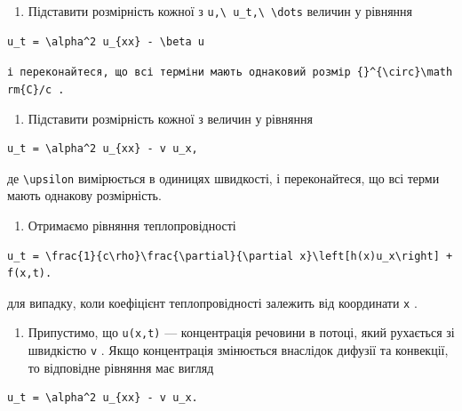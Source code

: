 \documentclass[
  ukrainian,
]{article}
\providecommand{\tightlist}{%
  \setlength{\itemsep}{0pt}\setlength{\parskip}{0pt}}
\begin{document}
\begin{enumerate}
\def\labelenumi{\arabic{enumi}.}
\tightlist
\item
  Підставити розмірність кожної з
  \texttt{u,\textbackslash{}\ u\_t,\textbackslash{}\ \textbackslash{}dots}
  величин у рівняння
\end{enumerate}

\begin{verbatim}
u_t = \alpha^2 u_{xx} - \beta u
\end{verbatim}

\texttt{і\ переконайтеся,\ що\ всі\ терміни\ мають\ однаковий\ розмір\ \textquotesingle{}\{\}\^{}\{\textbackslash{}circ\}\textbackslash{}mathrm\{C\}/c\textquotesingle{}\ .}

\begin{enumerate}
\def\labelenumi{\arabic{enumi}.}
\setcounter{enumi}{1}
\tightlist
\item
  Підставити розмірність кожної з величин у рівняння
\end{enumerate}

\begin{verbatim}
u_t = \alpha^2 u_{xx} - v u_x,
\end{verbatim}

де \texttt{\textbackslash{}upsilon} вимірюється в одиницях швидкості, і
переконайтеся, що всі терми мають однакову розмірність.

\begin{enumerate}
\def\labelenumi{\arabic{enumi}.}
\setcounter{enumi}{2}
\tightlist
\item
  Отримаємо рівняння теплопровідності
\end{enumerate}

\begin{verbatim}
u_t = \frac{1}{c\rho}\frac{\partial}{\partial x}\left[h(x)u_x\right] + f(x,t).
\end{verbatim}

для випадку, коли коефіцієнт теплопровідності залежить від координати
\texttt{x} .

\begin{enumerate}
\def\labelenumi{\arabic{enumi}.}
\setcounter{enumi}{3}
\tightlist
\item
  Припустимо, що \texttt{u(x,t)} --- концентрація речовини в потоці,
  який рухається зі швидкістю \texttt{v} . Якщо концентрація змінюється
  внаслідок дифузії та конвекції, то відповідне рівняння має вигляд
\end{enumerate}

\begin{verbatim}
u_t = \alpha^2 u_{xx} - v u_x.
\end{verbatim}
\end{document}
